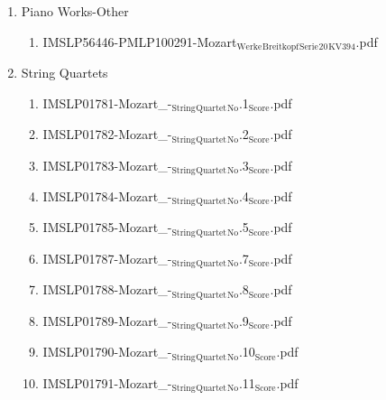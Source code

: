 \documentclass[11pt]{article}
\begin{document}
\begin{enumerate}
\item Piano Works-Other
\label{sec-1-1-1-1-44-49-8}
\begin{enumerate}
\item IMSLP56446-PMLP100291-Mozart$_{\text{Werke}}$$_{\text{Breitkopf}}$$_{\text{Serie}}$$_{\text{20}}$$_{\text{KV394}}$.pdf
\label{sec-1-1-1-1-44-49-8-1}
\end{enumerate}

\item String Quartets
\label{sec-1-1-1-1-44-49-9}
\begin{enumerate}
\item IMSLP01781-Mozart\_-$_{\text{String}}$$_{\text{Quartet}}$$_{\text{No}}$.1$_{\text{Score}}$.pdf
\label{sec-1-1-1-1-44-49-9-1}

\item IMSLP01782-Mozart\_-$_{\text{String}}$$_{\text{Quartet}}$$_{\text{No}}$.2$_{\text{Score}}$.pdf
\label{sec-1-1-1-1-44-49-9-2}

\item IMSLP01783-Mozart\_-$_{\text{String}}$$_{\text{Quartet}}$$_{\text{No}}$.3$_{\text{Score}}$.pdf
\label{sec-1-1-1-1-44-49-9-3}

\item IMSLP01784-Mozart\_-$_{\text{String}}$$_{\text{Quartet}}$$_{\text{No}}$.4$_{\text{Score}}$.pdf
\label{sec-1-1-1-1-44-49-9-4}

\item IMSLP01785-Mozart\_-$_{\text{String}}$$_{\text{Quartet}}$$_{\text{No}}$.5$_{\text{Score}}$.pdf
\label{sec-1-1-1-1-44-49-9-5}

\item IMSLP01787-Mozart\_-$_{\text{String}}$$_{\text{Quartet}}$$_{\text{No}}$.7$_{\text{Score}}$.pdf
\label{sec-1-1-1-1-44-49-9-6}

\item IMSLP01788-Mozart\_-$_{\text{String}}$$_{\text{Quartet}}$$_{\text{No}}$.8$_{\text{Score}}$.pdf
\label{sec-1-1-1-1-44-49-9-7}

\item IMSLP01789-Mozart\_-$_{\text{String}}$$_{\text{Quartet}}$$_{\text{No}}$.9$_{\text{Score}}$.pdf
\label{sec-1-1-1-1-44-49-9-8}

\item IMSLP01790-Mozart\_-$_{\text{String}}$$_{\text{Quartet}}$$_{\text{No}}$.10$_{\text{Score}}$.pdf
\label{sec-1-1-1-1-44-49-9-9}

\item IMSLP01791-Mozart\_-$_{\text{String}}$$_{\text{Quartet}}$$_{\text{No}}$.11$_{\text{Score}}$.pdf
\label{sec-1-1-1-1-44-49-9-10}


\end{enumerate}
\end{enumerate}
\end{document}
